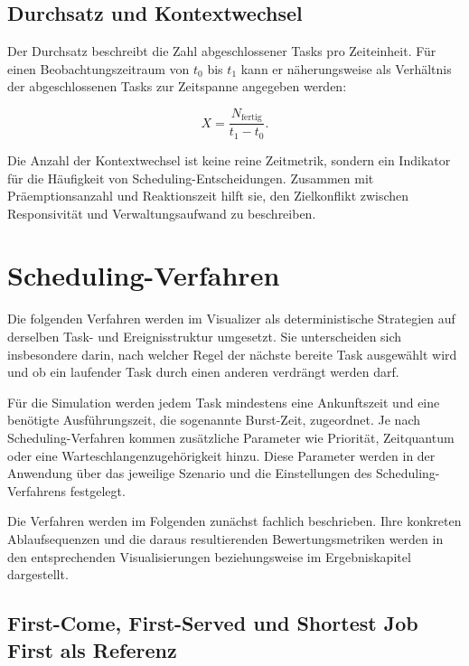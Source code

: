 \subsection{Durchsatz und Kontextwechsel}

Der Durchsatz beschreibt die Zahl abgeschlossener Tasks pro Zeiteinheit. Für einen Beobachtungszeitraum von $t_0$ bis $t_1$ kann er näherungsweise als Verhältnis der abgeschlossenen Tasks zur Zeitspanne angegeben werden:

\begin{equation}
X = \frac{N_{\mathrm{fertig}}}{t_1 - t_0}.
\label{eq:durchsatz}
\end{equation}

Die Anzahl der Kontextwechsel ist keine reine Zeitmetrik, sondern ein Indikator für die Häufigkeit von Scheduling-Entscheidungen. Zusammen mit Präemptionsanzahl und Reaktionszeit hilft sie, den Zielkonflikt zwischen Responsivität und Verwaltungsaufwand zu beschreiben.

\section{Scheduling-Verfahren}

Die folgenden Verfahren werden im Visualizer als deterministische Strategien auf derselben Task- und Ereignisstruktur umgesetzt. Sie unterscheiden sich insbesondere darin, nach welcher Regel der nächste bereite Task ausgewählt wird und ob ein laufender Task durch einen anderen verdrängt werden darf.

Für die Simulation werden jedem Task mindestens eine Ankunftszeit und eine benötigte Ausführungszeit, die sogenannte Burst-Zeit, zugeordnet. Je nach Scheduling-Verfahren kommen zusätzliche Parameter wie Priorität, Zeitquantum oder eine Warteschlangenzugehörigkeit hinzu. Diese Parameter werden in der Anwendung über das jeweilige Szenario und die Einstellungen des Scheduling-Verfahrens festgelegt.

Die Verfahren werden im Folgenden zunächst fachlich beschrieben. Ihre konkreten Ablaufsequenzen und die daraus resultierenden Bewertungsmetriken werden in den entsprechenden Visualisierungen beziehungsweise im Ergebniskapitel dargestellt.

\subsection{First-Come, First-Served und Shortest Job First als Referenz}

